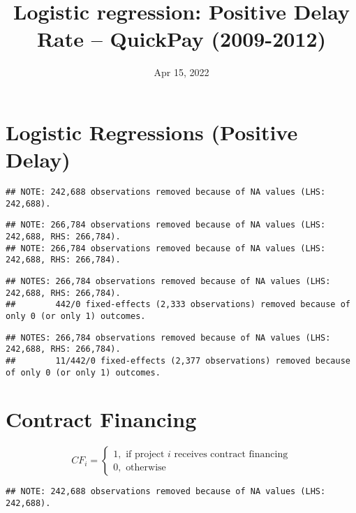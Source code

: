 \documentclass[
]{article}
\title{Logistic regression: Positive Delay Rate -- QuickPay (2009-2012)}
\author{}
\date{\vspace{-2.5em}Apr 15, 2022}
\begin{document}
\maketitle

\hypertarget{logistic-regressions-positive-delay}{%
\section{Logistic Regressions (Positive
Delay)}\label{logistic-regressions-positive-delay}}

\begin{verbatim}
## NOTE: 242,688 observations removed because of NA values (LHS: 242,688).
\end{verbatim}

\begin{verbatim}
## NOTE: 266,784 observations removed because of NA values (LHS: 242,688, RHS: 266,784).
## NOTE: 266,784 observations removed because of NA values (LHS: 242,688, RHS: 266,784).
\end{verbatim}

\begin{verbatim}
## NOTES: 266,784 observations removed because of NA values (LHS: 242,688, RHS: 266,784).
##        442/0 fixed-effects (2,333 observations) removed because of only 0 (or only 1) outcomes.
\end{verbatim}

\begin{verbatim}
## NOTES: 266,784 observations removed because of NA values (LHS: 242,688, RHS: 266,784).
##        11/442/0 fixed-effects (2,377 observations) removed because of only 0 (or only 1) outcomes.
\end{verbatim}

\hypertarget{contract-financing}{%
\section{Contract Financing}\label{contract-financing}}

\[ CF_i = \begin{cases} 1, \text{ if project } i \text{ receives contract financing}\\
0, \text{ otherwise} \end{cases}\]

\begin{verbatim}
## NOTE: 242,688 observations removed because of NA values (LHS: 242,688).
\end{verbatim}
\end{document}

